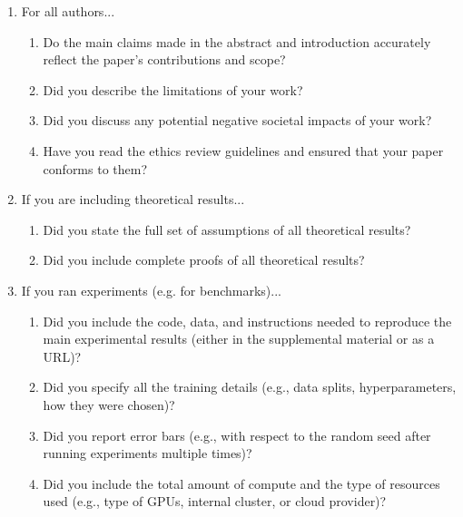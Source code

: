 \documentclass[]{article}
\begin{document}
\begin{enumerate}
	
	\item For all authors...
	\begin{enumerate}
		\item Do the main claims made in the abstract and introduction accurately reflect the paper's contributions and scope?
		\item Did you describe the limitations of your work?
		\answerTODO{}
		\item Did you discuss any potential negative societal impacts of your work?
		\answerTODO{}
		\item Have you read the ethics review guidelines and ensured that your paper conforms to them?
		\answerTODO{}
	\end{enumerate}
	
	\item If you are including theoretical results...
	\begin{enumerate}
		\item Did you state the full set of assumptions of all theoretical results?
		\answerTODO{}
		\item Did you include complete proofs of all theoretical results?
		\answerTODO{}
	\end{enumerate}
	
	\item If you ran experiments (e.g. for benchmarks)...
	\begin{enumerate}
		\item Did you include the code, data, and instructions needed to reproduce the main experimental results (either in the supplemental material or as a URL)?
		\answerTODO{}
		\item Did you specify all the training details (e.g., data splits, hyperparameters, how they were chosen)?
		\answerTODO{}
		\item Did you report error bars (e.g., with respect to the random seed after running experiments multiple times)?
		\answerTODO{}
		\item Did you include the total amount of compute and the type of resources used (e.g., type of GPUs, internal cluster, or cloud provider)?
		\answerTODO{}
	\end{enumerate}
	

\end{enumerate}
\end{document}
